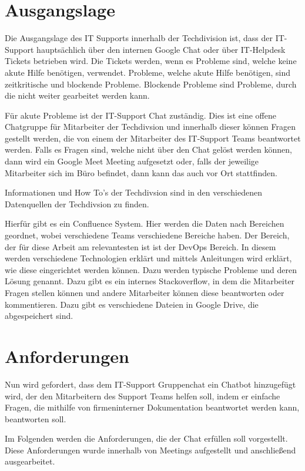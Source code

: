\section{Ausgangslage}
Die Ausgangslage des IT Supports innerhalb der Techdivision ist, dass 
der IT-Support hauptsächlich über den internen Google Chat oder 
über IT-Helpdesk Tickets betrieben wird. Die Tickets werden, wenn es Probleme sind, 
welche keine akute Hilfe benötigen, verwendet. Probleme, welche akute Hilfe benötigen, sind 
zeitkritische und blockende
Probleme. Blockende Probleme sind Probleme, 
durch die nicht weiter gearbeitet werden kann.\par 
Für akute Probleme ist der IT-Support Chat zuständig.
Dies ist eine offene Chatgruppe für Mitarbeiter der Techdivsion und innerhalb 
dieser können Fragen gestellt werden, die von einem der Mitarbeiter 
des IT-Support Teams beantwortet werden. Falls es Fragen sind, welche nicht über den 
Chat gelöst werden können, dann wird ein Google Meet Meeting aufgesetzt oder, falls der 
jeweilige Mitarbeiter sich im Büro befindet, dann kann das auch vor Ort stattfinden.\par
Informationen und How To's der Techdivsion sind in den verschiedenen Datenquellen der 
Techdivsion zu finden.\par
Hierfür gibt es ein Confluence System. Hier werden die Daten nach Bereichen geordnet, wobei
verschiedene Teams verschiedene Bereiche haben. Der Bereich, der für diese Arbeit am relevantesten 
ist ist der DevOps Bereich. In diesem werden verschiedene Technologien erklärt und mittels Anleitungen 
wird erklärt, wie diese eingerichtet werden können. Dazu werden typische Probleme und deren Lösung genannt. Dazu gibt es ein internes Stackoverflow, 
in dem die Mitarbeiter Fragen stellen können und andere Mitarbeiter können diese beantworten oder kommentieren.
Dazu gibt es verschiedene Dateien in Google Drive, die abgespeichert sind. 

\section{Anforderungen}
\label{s:anf:anf}
Nun wird gefordert, dass dem IT-Support Gruppenchat ein Chatbot hinzugefügt wird, 
der den Mitarbeitern des Support Teams helfen soll, indem er einfache Fragen, 
die mithilfe von firmeninterner Dokumentation beantwortet werden kann, beantworten soll. \par
Im Folgenden werden die Anforderungen, die der Chat erfüllen soll 
vorgestellt. Diese Anforderungen wurde innerhalb von Meetings aufgestellt und anschließend 
ausgearbeitet.

